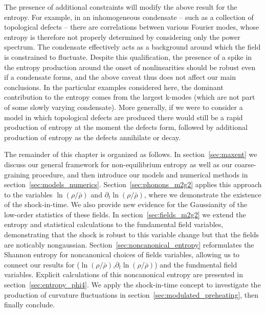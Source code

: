 \documentclass[11pt,a4paper]{article}
\def\lnr{\ln(\rho/\bar{\rho})}
\def\dlnr{\partial_t\ln(\rho/\bar{\rho})}
\begin{document}
The presence of additional constraints will modify the above result for the entropy.
For example, in an inhomogeneous condensate -- such as a collection of topological defects -- there are
correlations between various Fourier modes, whose entropy is therefore not properly determined by considering only the power spectrum.
The condensate effectively acts as a background around which the field is constrained to fluctuate.
Despite this qualification, the presence of a spike in the entropy production around the onset of nonlinearities should be robust even if a condensate forms, and the above caveat thus does not affect our main conclusions.
In the particular examples considered here, the dominant contribution to the entropy comes from the largest k-modes (which are not part of some slowly varying condensate).
More generally, if we were to consider a model in which topological defects are produced there would still be a rapid production of entropy at the moment the defects form, 
followed by additional production of entropy as the defects annihilate or decay.


The remainder of this chapter is organized as follows.
In section~\ref{sec:maxent} we discuss our general framework for non-equilibrium entropy as well as our coarse-graining procedure,
and then introduce our models and numerical methods in section~\ref{sec:models_numerics}.
Section~\ref{sec:phonons_m2g2} applies this approach to the variables $\lnr$ and $\dlnr$, where we demonstrate the existence of the shock-in-time.
We also provide new evidence for the Gaussianity of the low-order statistics of these fields.
In section~\ref{sec:fields_m2g2} we extend the entropy and statistical calculations to the fundamental field variables, demonstrating that the shock is robust to this variable change but that the fields are noticably nongaussian.
Section~\ref{sec:noncanonical_entropy} reformulates the Shannon entropy for noncanonical choices of fields variables, allowing us to connect our results for ($\lnr$,$\dlnr$) and the fundmental field variables.
Explicit calculations of this noncanonical entropy are presented in section~\ref{sec:entropy_phi4}.
We apply the shock-in-time concept to investigate the production of curvature fluctuations in section~\ref{sec:modulated_preheating},
then finally conclude.
\end{document}
